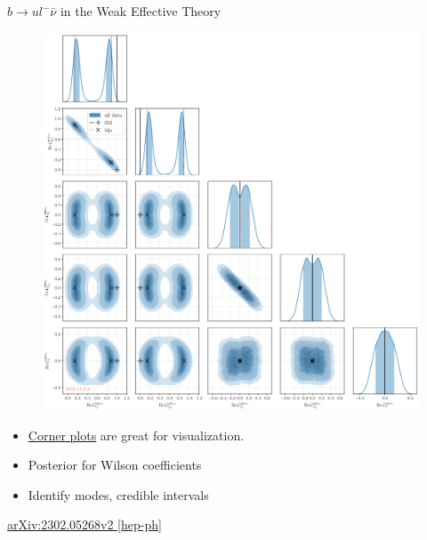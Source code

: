 \documentclass[
aspectratio=169,
14pt,
professionalfonts
]{beamer}
\begin{document}
\begin{frame}{$b\to u l^- \bar \nu$ in the Weak Effective Theory}
    \vspace{-0.5cm}
    \begin{minipage}{0.5\textwidth}
        \begin{figure}
            \includegraphics[width=\textwidth]{../plots/wet-posterior.png}
        \end{figure}
    \end{minipage}
    \begin{minipage}{0.49\textwidth}
        \begin{itemize}
            \item \href{https://corner.readthedocs.io/en/latest/}{Corner plots} are great for visualization.
            \item Posterior for Wilson coefficients
            \item Identify modes, credible intervals
        \end{itemize}
        \vspace{0.5cm}
        \begin{flushright}
            \href{https://arxiv.org/pdf/2302.05268}{arXiv:2302.05268v2 [hep-ph]}
        \end{flushright}
    \end{minipage}
\end{frame}
\end{document}
